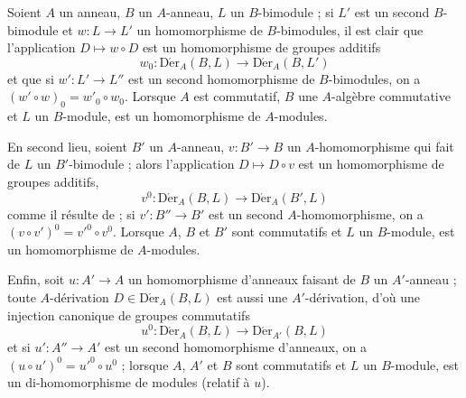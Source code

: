 \begin{env}[20.2.1]
\label{0.20.2.1-fr}
Soient $A$ un anneau, $B$ un $A$-anneau, $L$ un $B$-bimodule ; si $L'$ est
un second $B$-bimodule et $w:L\to L'$ un homomorphisme de $B$-bimodules, il
est clair que l'application $D\mapsto w\circ D$ est un homomorphisme de
groupes additifs
\begin{equation}
\tag{20.2.1.1}
\label{0.20.2.1.1-fr}
  w_0:\operatorname{D\acute{e}r}_A(B,L)\to\operatorname{D\acute{e}r}_A(B,L')
\end{equation}
et que si $w':L'\to L''$ est un second homomorphisme de $B$-bimodules, on a
$(w'\circ w)_0=w'_0\circ w_0$. Lorsque $A$ est commutatif, $B$ une
$A$-algèbre commutative et $L$ un $B$-module,  est un
homomorphisme de $A$-modules.

En second lieu, soient $B'$ un $A$-anneau, $v:B'\to B$ un
$A$-homomorphisme qui fait de $L$ un $B'$-bimodule ; alors l'application
$D\mapsto D\circ v$ est un homomorphisme de groupes additifs,
\begin{equation}
\tag{20.2.1.2}
\label{0.20.2.1.2-fr}
  v^0:\operatorname{D\acute{e}r}_A(B,L)\to\operatorname{D\acute{e}r}_A(B',L)
\end{equation}
comme il résulte de  ; si $v':B''\to B'$ est un second
$A$-homomorphisme, on a $(v\circ v')^0=v'^0\circ v^0$. Lorsque $A$, $B$ et
$B'$ sont commutatifs et $L$ un $B$-module,  est un
homomorphisme de $A$-modules.

Enfin, soit $u:A'\to A$ un homomorphisme d'anneaux faisant de $B$ un
$A'$-anneau ; toute $A$-dérivation $D\in\operatorname{D\acute{e}r}_A(B,L)$ est aussi
une $A'$-dérivation, d'où une injection canonique de groupes commutatifs
\begin{equation}
\tag{20.2.1.3}
\label{0.20.2.1.3-fr}
  u^0:\operatorname{D\acute{e}r}_A(B,L)\to\operatorname{D\acute{e}r}_{A'}(B,L)
\end{equation}
et si $u':A''\to A'$ est un second homomorphisme d'anneaux, on a
$(u\circ u')^0=u'^0\circ u^0$ ; lorsque $A$, $A'$ et $B$ sont commutatifs et
$L$ un $B$-module,  est un di-homomorphisme de modules
(relatif à $u$).


\end{env}
